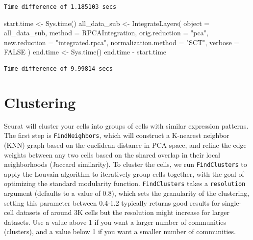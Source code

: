 \documentclass[
  letterpaper,
  DIV=11,
  numbers=noendperiod]{scrreprt}
\newenvironment{Shaded}{\begin{snugshade}}{\end{snugshade}}
\newcommand{\AttributeTok}[1]{\textcolor[rgb]{0.40,0.45,0.13}{#1}}
\newcommand{\ConstantTok}[1]{\textcolor[rgb]{0.56,0.35,0.01}{#1}}
\newcommand{\FunctionTok}[1]{\textcolor[rgb]{0.28,0.35,0.67}{#1}}
\newcommand{\NormalTok}[1]{\textcolor[rgb]{0.00,0.23,0.31}{#1}}
\newcommand{\OtherTok}[1]{\textcolor[rgb]{0.00,0.23,0.31}{#1}}
\newcommand{\SpecialCharTok}[1]{\textcolor[rgb]{0.37,0.37,0.37}{#1}}
\newcommand{\StringTok}[1]{\textcolor[rgb]{0.13,0.47,0.30}{#1}}
\begin{document}
\begin{verbatim}
Time difference of 1.185103 secs
\end{verbatim}

\begin{Shaded}
\begin{Highlighting}[]
\NormalTok{start.time }\OtherTok{\textless{}{-}} \FunctionTok{Sys.time}\NormalTok{()}
\NormalTok{all\_data\_sub }\OtherTok{\textless{}{-}} \FunctionTok{IntegrateLayers}\NormalTok{(}
  \AttributeTok{object =}\NormalTok{ all\_data\_sub, }\AttributeTok{method =}\NormalTok{ RPCAIntegration,}
  \AttributeTok{orig.reduction =} \StringTok{"pca"}\NormalTok{, }\AttributeTok{new.reduction =} \StringTok{"integrated.rpca"}\NormalTok{, }\AttributeTok{normalization.method =} \StringTok{"SCT"}\NormalTok{,}
  \AttributeTok{verbose =} \ConstantTok{FALSE}
\NormalTok{)}
\NormalTok{end.time }\OtherTok{\textless{}{-}} \FunctionTok{Sys.time}\NormalTok{()}
\NormalTok{end.time }\SpecialCharTok{{-}}\NormalTok{ start.time}
\end{Highlighting}
\end{Shaded}

\begin{verbatim}
Time difference of 9.99814 secs
\end{verbatim}

\section{Clustering}\label{clustering}

Seurat will cluster your cells into groups of cells with similar
expression patterns. The first step is \texttt{FindNeighbors}, which
will construct a K-nearest neighbor (KNN) graph based on the euclidean
distance in PCA space, and refine the edge weights between any two cells
based on the shared overlap in their local neighborhoods (Jaccard
similarity). To cluster the cells, we run \texttt{FindClusters} to apply
the Louvain algorithm to iteratively group cells together, with the goal
of optimizing the standard modularity function. \texttt{FindClusters}
takes a \texttt{resolution} argument (defaults to a value of 0.8), which
sets the granularity of the clustering, setting this parameter between
0.4-1.2 typically returns good results for single-cell datasets of
around 3K cells but the resolution might increase for larger datasets.
Use a value above 1 if you want a larger number of communities
(clusters), and a value below 1 if you want a smaller number of
communities.
\end{document}
